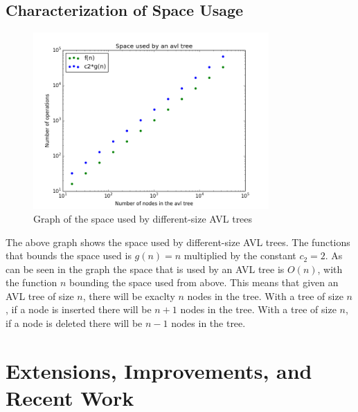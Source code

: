 \documentclass[12pt]{article}
\begin{document}
\subsection*{Characterization of Space Usage}
\begin{figure}[h]
\caption{Graph of the space used by different-size AVL trees}
\includegraphics[width=9cm]{space_used.png}
\centering
\end{figure}
\noindent
The above graph shows the space used by different-size AVL trees.  The functions
that bounds the space used is $g(n) = n$ multiplied by the constant $c_2 = 2$. 
As can be seen in the graph the space that is used by an AVL tree is $O(n)$,
with the function $n$ bounding the space used from above.  This means that given
an AVL tree of size $n$, there will be exaclty $n$ nodes in the tree.  With a
tree of size $n$, if a node is inserted there will be $n+1$ nodes in the tree. 
With a tree of size $n$, if a node is deleted there will be $n-1$ nodes in the
tree.

\section*{Extensions, Improvements, and Recent Work}

\newpage
{}



\end{document}
